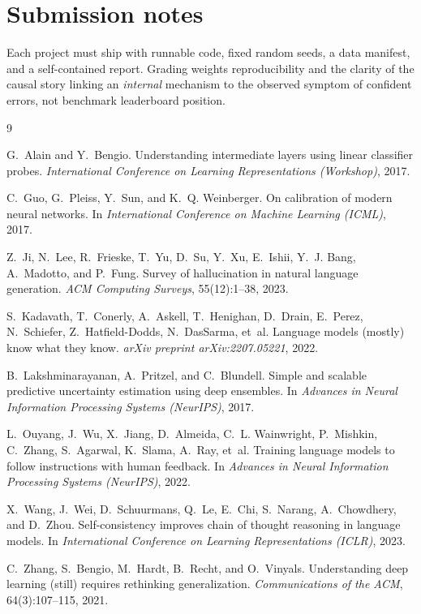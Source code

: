 \documentclass[11pt]{article}
\begin{document}
\section*{Submission notes}

Each project must ship with runnable code, fixed random seeds, a data manifest,
and a self-contained report. Grading weights reproducibility and the clarity of
the causal story linking an \emph{internal} mechanism to the observed symptom of
confident errors, not benchmark leaderboard position.

\begin{thebibliography}{9}

G.~Alain and Y.~Bengio.
\newblock Understanding intermediate layers using linear classifier probes.
\newblock \emph{International Conference on Learning Representations (Workshop)},
2017.

C.~Guo, G.~Pleiss, Y.~Sun, and K.~Q. Weinberger.
\newblock On calibration of modern neural networks.
\newblock In \emph{International Conference on Machine Learning (ICML)}, 2017.

Z.~Ji, N.~Lee, R.~Frieske, T.~Yu, D.~Su, Y.~Xu, E.~Ishii, Y.~J. Bang,
  A.~Madotto, and P.~Fung.
\newblock Survey of hallucination in natural language generation.
\newblock \emph{ACM Computing Surveys}, 55(12):1--38, 2023.

S.~Kadavath, T.~Conerly, A.~Askell, T.~Henighan, D.~Drain, E.~Perez,
  N.~Schiefer, Z.~Hatfield-Dodds, N.~DasSarma, et~al.
\newblock Language models (mostly) know what they know.
\newblock \emph{arXiv preprint arXiv:2207.05221}, 2022.

B.~Lakshminarayanan, A.~Pritzel, and C.~Blundell.
\newblock Simple and scalable predictive uncertainty estimation using deep
  ensembles.
\newblock In \emph{Advances in Neural Information Processing Systems
  (NeurIPS)}, 2017.

L.~Ouyang, J.~Wu, X.~Jiang, D.~Almeida, C.~L. Wainwright, P.~Mishkin, C.~Zhang,
  S.~Agarwal, K.~Slama, A.~Ray, et~al.
\newblock Training language models to follow instructions with human feedback.
\newblock In \emph{Advances in Neural Information Processing Systems
  (NeurIPS)}, 2022.

X.~Wang, J.~Wei, D.~Schuurmans, Q.~Le, E.~Chi, S.~Narang, A.~Chowdhery, and
  D.~Zhou.
\newblock Self-consistency improves chain of thought reasoning in language
  models.
\newblock In \emph{International Conference on Learning Representations (ICLR)},
2023.

C.~Zhang, S.~Bengio, M.~Hardt, B.~Recht, and O.~Vinyals.
\newblock Understanding deep learning (still) requires rethinking
  generalization.
\newblock \emph{Communications of the ACM}, 64(3):107--115, 2021.

\end{thebibliography}
\end{document}
